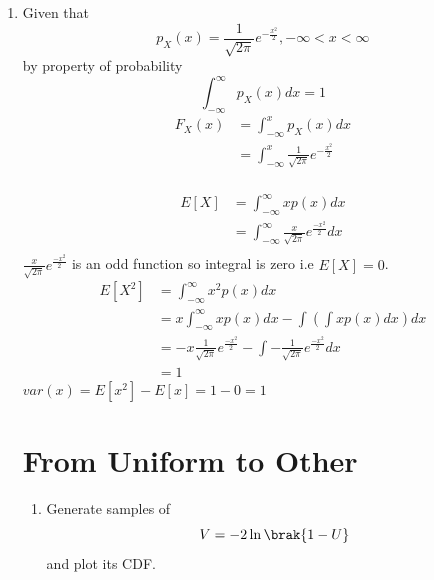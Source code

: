 \documentclass[journal,12pt,twocolumn]{IEEEtran}
\renewcommand\thesection{\arabic{section}}
\begin{document}
\begin{enumerate}[label=\thesection.\arabic*,ref=\thesection.\theenumi]
\item Given that 
$$p_X (x) = \frac{1}{\sqrt{2\pi}}e^{-\frac{x^2}{2}} ,-\infty <x< \infty$$
by property of probability $$\int_{-\infty} ^{\infty} p_X (x)dx = 1$$
\begin{align*}
    F_X (x) &= \int_{-\infty} ^{x} p_X (x) dx\\
     &=  \int_{-\infty} ^{x} \frac{1}{\sqrt{2\pi}}e^{-\frac{x^2}{2}} \\
\end{align*}

\begin{align*}
    E[X] &= \int_{-\infty} ^{\infty} xp(x) dx \\
    &= \int_{-\infty} ^{\infty} \frac{x}{\sqrt{2\pi}} e^{\frac{-x^2}{2}}dx \\
\end{align*}
$\frac{x}{\sqrt{2\pi}} e^{\frac{-x^2}{2}}$ is an odd function so integral is zero i.e $E[X] = 0$. \\

\begin{align*}
    E[X^2] &= \int_{-\infty} ^{\infty} x^{2} p(x) dx \\
    &= x\int_{-\infty} ^{\infty} xp(x) dx - \int \left(\int xp(x) dx\right)dx\\
    &= -x\frac{1}{\sqrt{2\pi}}e^{\frac{-x^2}{2}} - \int -\frac{1}{\sqrt{2\pi}}e^{\frac{-x^2}{2}} dx  \\
    &= 1
\end{align*}
$var(x) = E[x^2] - E[x] = 1 - 0 =1$

\section{From Uniform to Other}
\begin{enumerate}[label=\thesection.\arabic*,ref=\thesection.\theenumi]
\item
Generate samples of 
%
\begin{equation}
V = -2\ln\brak{1-U}
\end{equation}
%
and plot its CDF.\\ 
\solution


\end{enumerate}
\end{enumerate}
\end{document}
